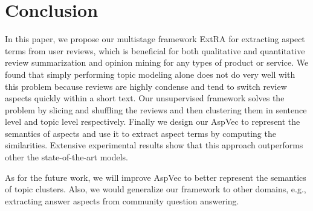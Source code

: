 \section{Conclusion}

In this paper, we propose our multistage framework ExtRA for extracting aspect terms from user reviews, 
which is beneficial for both qualitative and quantitative review 
summarization and opinion mining for any types of product or service. 
We found that simply performing topic modeling alone does not do
very well with this problem because reviews are highly condense and tend to
switch review aspects quickly within a short text. 
Our unsupervised framework solves the problem by slicing and shuffling
the reviews and then clustering them in sentence level and 
topic level respectively. Finally we design our AspVec to represent 
the semantics of aspects and use it to extract aspect terms by 
computing the similarities.
Extensive experimental results show that this approach
outperforms other the state-of-the-art models.

As for the future work, we will improve AspVec to better represent 
the semantics of topic clusters. Also, we would generalize 
our framework to other domains, e.g., extracting answer aspects 
from community question answering.
% 
